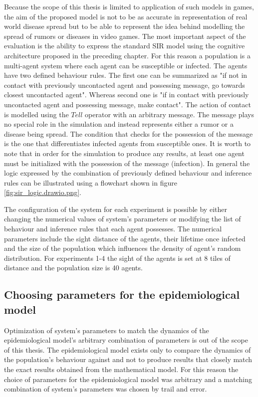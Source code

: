 Because the scope of this thesis is limited to application of such models in games, the aim of the proposed model is not to be as accurate in representation of real world disease spread but to be able to represent the idea behind modelling the spread of rumors or diseases in video games.
The most important aspect of the evaluation is the ability to express the standard SIR model using the cognitive architecture proposed in the preceding chapter.
For this reason a population is a multi-agent system where each agent can be susceptible or infected.
The agents have two defined behaviour rules.
The first one can be summarized as "if not in contact with previously uncontacted agent and possessing message, go towards closest uncontacted agent".
Whereas second one is "if in contact with previously uncontacted agent and possessing message, make contact".
The action of contact is modelled using the $Tell$ operator with an arbitrary message.
The message plays no special role in the simulation and instead represents either a rumor or a disease being spread.
The condition that checks for the possession of the message is the one that differentiates infected agents from susceptible ones.
It is worth to note that in order for the simulation to produce any results, at least one agent must be initialized with the possession of the message (infection).
In general the logic expressed by the combination of previously defined behaviour and inference rules can be illustrated using a flowchart shown in figure \ref{fig:sir_logic.drawio.png}.

The configuration of the system for each experiment is possible by either changing the numerical values of system's parameters or modifying the list of behaviour and inference rules that each agent possesses.
The numerical parameters include the sight distance of the agents, their lifetime once infected and the size of the population which influences the density of agent's random distribution.
For experiments 1-4 the sight of the agents is set at 8 tiles of distance and the population size is 40 agents.


\subsection{Choosing parameters for the epidemiological model}

Optimization of system's parameters to match the dynamics of the epidemiological model's arbitrary combination of parameters is out of the scope of this thesis.
The epidemiological model exists only to compare the dynamics of the population's behaviour against and not to produce results that closely match the exact results obtained from the mathematical model.
For this reason the choice of parameters for the epidemiological model was arbitrary and a matching combination of system's parameters was chosen by trail and error.

